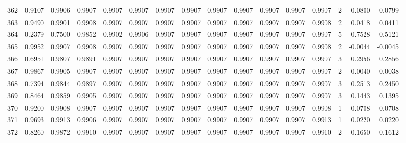 \begin{tabular}{lrrrrrrrrrrrrrrr}
362 &      0.9107 &  0.9906 &  0.9907 &  0.9907 &  0.9907 &  0.9907 &  0.9907 &  0.9907 &  0.9907 &  0.9907 &   0.9907 &     0.9907 &      2 &                    0.0800 &                     0.0799 \\
363 &      0.9490 &  0.9901 &  0.9908 &  0.9907 &  0.9907 &  0.9907 &  0.9907 &  0.9907 &  0.9907 &  0.9907 &   0.9907 &     0.9908 &      2 &                    0.0418 &                     0.0411 \\
364 &      0.2379 &  0.7500 &  0.9852 &  0.9902 &  0.9906 &  0.9907 &  0.9907 &  0.9907 &  0.9907 &  0.9907 &   0.9907 &     0.9907 &      5 &                    0.7528 &                     0.5121 \\
365 &      0.9952 &  0.9907 &  0.9908 &  0.9907 &  0.9907 &  0.9907 &  0.9907 &  0.9907 &  0.9907 &  0.9907 &   0.9907 &     0.9908 &      2 &                   -0.0044 &                    -0.0045 \\
366 &      0.6951 &  0.9807 &  0.9891 &  0.9907 &  0.9907 &  0.9907 &  0.9907 &  0.9907 &  0.9907 &  0.9907 &   0.9907 &     0.9907 &      3 &                    0.2956 &                     0.2856 \\
367 &      0.9867 &  0.9905 &  0.9907 &  0.9907 &  0.9907 &  0.9907 &  0.9907 &  0.9907 &  0.9907 &  0.9907 &   0.9907 &     0.9907 &      2 &                    0.0040 &                     0.0038 \\
368 &      0.7394 &  0.9844 &  0.9897 &  0.9907 &  0.9907 &  0.9907 &  0.9907 &  0.9907 &  0.9907 &  0.9907 &   0.9907 &     0.9907 &      3 &                    0.2513 &                     0.2450 \\
369 &      0.8464 &  0.9859 &  0.9905 &  0.9907 &  0.9907 &  0.9907 &  0.9907 &  0.9907 &  0.9907 &  0.9907 &   0.9907 &     0.9907 &      3 &                    0.1443 &                     0.1395 \\
370 &      0.9200 &  0.9908 &  0.9907 &  0.9907 &  0.9907 &  0.9907 &  0.9907 &  0.9907 &  0.9907 &  0.9907 &   0.9907 &     0.9908 &      1 &                    0.0708 &                     0.0708 \\
371 &      0.9693 &  0.9913 &  0.9906 &  0.9907 &  0.9907 &  0.9907 &  0.9907 &  0.9907 &  0.9907 &  0.9907 &   0.9907 &     0.9913 &      1 &                    0.0220 &                     0.0220 \\
372 &      0.8260 &  0.9872 &  0.9910 &  0.9907 &  0.9907 &  0.9907 &  0.9907 &  0.9907 &  0.9907 &  0.9907 &   0.9907 &     0.9910 &      2 &                    0.1650 &                     0.1612 \\

\end{tabular}
